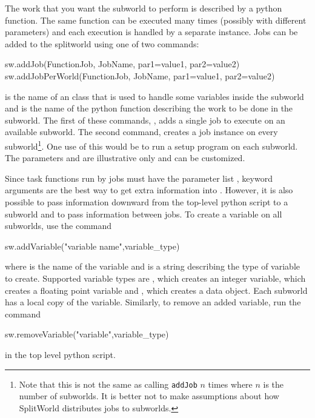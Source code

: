 \vspace{\baselineskip}
\noindent The work that you want the subworld to perform is described by a python function. The same function can be executed many times (possibly with different parameters) and each execution is handled by a separate instance. Jobs can be added to the splitworld using one of two commands:
\begin{python}
sw.addJob(FunctionJob, JobName, par1=value1, par2=value2)
sw.addJobPerWorld(FunctionJob, JobName, par1=value1, par2=value2)
\end{python}
 is the name of an \escript class that is used to handle some variables inside the subworld and  is the name of the python function describing the work to be done in the subworld. 
The first of these commands, , adds a single job to execute on an available subworld. The second command,  creates a job instance on every subworld\footnote{
Note that this is not the same as calling \texttt{addJob} $n$ times where $n$ is the number of subworlds.
It is better not to make assumptions about how SplitWorld distributes jobs to subworlds.
}. One use of this would be to run a setup program on each subworld. The parameters  and  are illustrative only and can be customized. 

\vspace{\baselineskip}
\noindent Since task functions run by jobs must have the parameter list , keyword arguments are the best way to get extra information into . However, it is also possible to pass information downward from the top-level python script to a subworld and to pass information between jobs. To create a variable on all subworlds, use the command
\begin{python}
sw.addVariable("variable name",variable_type)
\end{python}
where  is the name of the variable and  is a string describing the type of variable to create. Supported variable types are , which creates an integer variable,  which creates a floating point variable and , which creates a data object. Each subworld has a local copy of the variable. Similarly, to remove an added variable, run the command
\begin{python}
sw.removeVariable("variable",variable_type)
\end{python}
in the top level python script.

